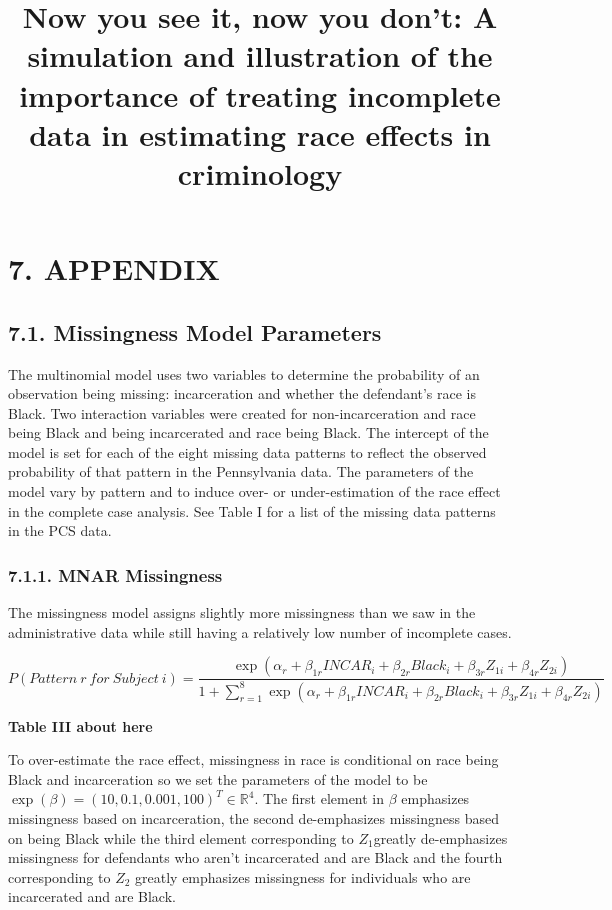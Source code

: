 \documentclass[titlepage]{article}
\title{Now you see it, now you don't: A simulation and illustration of the importance of treating incomplete data in estimating race effects in criminology}
\author{}
\date{} %
\begin{document}
\pagestyle{fancy}
\fancyhf{}
\fancyfoot[R]{\thepage}


\section*{7. APPENDIX}

\subsection*{7.1. Missingness Model Parameters}

The multinomial model uses two variables to determine the probability of an observation being missing: incarceration and whether the defendant’s race is Black. Two interaction variables were created for non-incarceration and race being Black and being incarcerated and race being Black. The intercept of the model is set for each of the eight missing data patterns to reflect the observed probability of that pattern in the Pennsylvania data. The parameters of the model vary by pattern and to induce over- or under-estimation of the race effect in the complete case analysis. See Table I for a list of the missing data patterns in the PCS data.

\subsubsection*{7.1.1. MNAR Missingness}

The missingness model assigns slightly more missingness than we saw in the administrative data while still having a relatively low number of incomplete cases.

\begin{equation}\label{eq:miss-model-4par}
    P(Pattern ~ r ~ for ~ Subject ~ i) = \frac{\exp\left(\alpha_r + \beta_{1r} INCAR_i + \beta_{2r} Black_i + \beta_{3r} Z_{1i} + \beta_{4r} Z_{2i}\right)}{1 + \sum_{r=1}^8 \exp\left(\alpha_r + \beta_{1r} INCAR_i + \beta_{2r} Black_i + \beta_{3r} Z_{1i} + \beta_{4r} Z_{2i}\right)}
\end{equation}

\begin{center}
    \textbf{Table III about here}
\end{center}

To over-estimate the race effect, missingness in race is conditional on race being Black and incarceration so we set the parameters of the model to be \(\exp(\beta) = (10, 0.1, 0.001, 100)^T \in \mathbb{R}^4\). The first element in $\beta$ emphasizes missingness based on incarceration, the second de-emphasizes missingness based on being Black while the third element corresponding to \(Z_1\)greatly de-emphasizes missingness for defendants who aren’t incarcerated and are Black and the fourth corresponding to \(Z_2\) greatly emphasizes missingness for individuals who are incarcerated and are Black.
\end{document}
